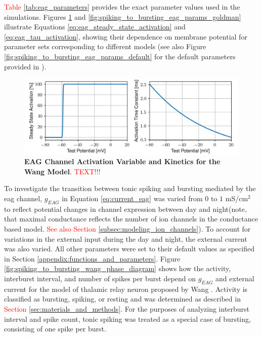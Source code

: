 \documentclass[../main.tex]{subfiles}
\begin{document}
\textcolor{red}{Table \ref{tab:eag_parameters}} provides the exact parameter values used in the simulations. Figures \ref{fig:spiking_to_bursting_eag_params_wang} and \ref{fig:spiking_to_bursting_eag_params_goldman} illustrate Equations \ref{eq:eag_steady_state_activation} and \ref{eq:eag_tau_activation}, showing their dependence on membrane potential for parameter sets corresponding to different models (see also Figure \ref{fig:spiking_to_bursting_eag_params_default} for the default parameters provided in \parencite{bronkRegulationEagCa22018}).

\begin{figure}[!t]
    \centering
    \includegraphics[width=0.8\linewidth]{../img/spiking_to_bursting/eag_wang.png}
    \caption[EAG Channel Activation Variable and Kinetics for the Wang Model]{
        \textbf{EAG Channel Activation Variable and Kinetics for the Wang Model}. \textcolor{red}{TEXT!!!}
    }
    \label{fig:spiking_to_bursting_eag_params_wang}
\end{figure}

To investigate the transition between tonic spiking and bursting mediated by the \gls{eag} channel, $g_{EAG}$ in Equation \ref{eq:current_eag} was varied from $0$ to $1$ mS/cm$^2$ to reflect potential changes in channel expression between day and night(note, that maximal conductance reflects the number of ion channels in the conductance based model. \textcolor{red}{See also Section \ref{subsec:modeling_ion_channels}}). To account for variations in the external input during the day and night, the external current was also varied. All other parameters were set to their default values as specified in Section \ref{appendix:functions_and_parameters}. Figure \ref{fig:spiking_to_bursting_wang_phase_diagram} shows how the activity, interburst interval, and number of spikes per burst depend on $g_{EAG}$ and external current for the model of thalamic relay neuron proposed by Wang \parencite{wangMultipleDynamicalModes1994}. Activity is classified as bursting, spiking, or resting and was determined as described in \textcolor{red}{Section \ref{sec:materials_and_methods}}. For the purposes of analyzing interburst interval and spike count, tonic spiking was treated as a special case of bursting, consisting of one spike per burst.
\end{document}
